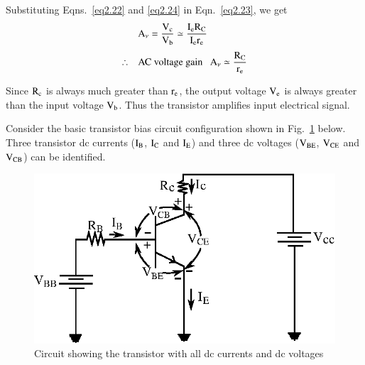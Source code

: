 Substituting Eqns.~\eqref{eq2.22} and \eqref{eq2.24} in Eqn.~\eqref{eq2.23}, we get
\begin{align}
& \textrm{A}_{\nu} = \frac{\textrm{V}_{\textrm{c}}}{\textrm{V}_{\textrm{b}}}\simeq \frac{\textrm{I}_{\textrm{e}}\textrm{R}_{\textrm{C}}}{\textrm{I}_{\textrm{e}}\textrm{r}_{\textrm{e}}}\notag\\[3pt]
\therefore\quad & \text{AC voltage gain~~ } \textrm{A}_{\nu}\simeq \frac{\textrm{R}_{\textrm{C}}}{\textrm{r}_{\textrm{e}}}\label{eq2.25}
\end{align}

Since $\textrm{R}_{\textrm{c}}$ is always much greater than $\textrm{r}_{\textrm{e}}$, the output voltage $\textrm{V}_{\textrm{e}}$ is always greater than the input voltage $\textrm{V}_{\textrm{b}}$. Thus the transistor amplifies input electrical signal.

\begin{note}
Consider the basic transistor bias circuit configuration shown in Fig.~\ref{fig2.10} below. Three transistor dc currents ($\textrm{I}_{\textrm{B}}$, $\textrm{I}_{\textrm{C}}$ and $\textrm{I}_{\textrm{E}}$) and three dc voltages ($\textrm{V}_{\text{BE}}$, $\textrm{V}_{\text{CE}}$ and $\textrm{V}_{\text{CB}}$) can be identified.

\smallskip 
\begin{figure}[H]
\centering
\includegraphics[scale=1.05]{chap2/fig10.eps}
\caption{Circuit showing the transistor with all dc currents and dc voltages}\label{fig2.10}
\end{figure}
\end{note}

\medskip

